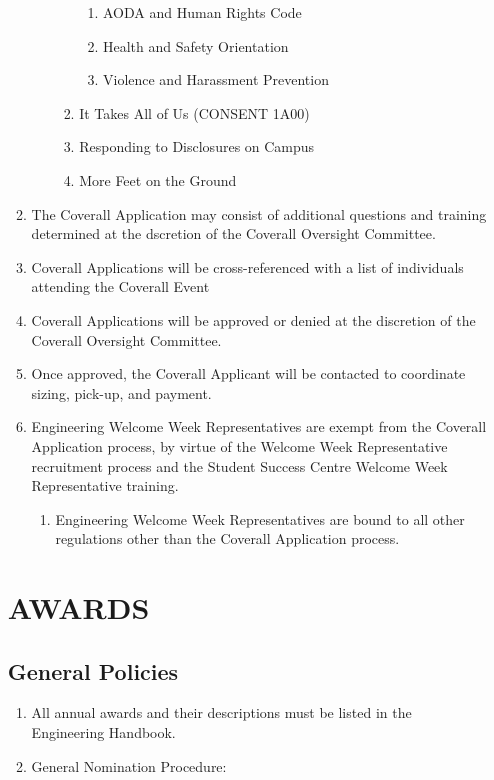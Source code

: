 \begin{enumerate}
\begin{enumerate}
\begin{enumerate}
\begin{enumerate}
      \begin{enumerate}
       \item
        AODA and Human Rights Code
       \item
        Health and Safety Orientation
       \item
        Violence and Harassment Prevention
      \end{enumerate}
     \item
      It Takes All of Us (CONSENT 1A00)
     \item
      Responding to Disclosures on Campus
     \item
      More Feet on the Ground
    \end{enumerate}
  \end{enumerate}
 \item
  The Coverall Application may consist of additional questions and
  training determined at the dscretion of the Coverall Oversight
  Committee.
 \item
  Coverall Applications will be cross-referenced with a list of
  individuals attending the Coverall Event
 \item
  Coverall Applications will be approved or denied at the discretion of
  the Coverall Oversight Committee.
 \item
  Once approved, the Coverall Applicant will be contacted to coordinate
  sizing, pick-up, and payment.
 \item
  Engineering Welcome Week Representatives are exempt from the Coverall
  Application process, by virtue of the Welcome Week Representative
  recruitment process and the Student Success Centre Welcome Week
  Representative training.
  \begin{enumerate}
    \item
     Engineering Welcome Week Representatives are bound to all other
     regulations other than the Coverall Application process.
  \end{enumerate}
\end{enumerate}

\hypertarget{awards}{%
 \section{AWARDS}
 \label{awards}}

\hypertarget{general-policies}{%
 \subsection{General Policies}
 \label{general-policies}}
\begin{enumerate}
 \item
  All annual awards and their descriptions must be listed in the
  Engineering Handbook.
 \item
  General Nomination Procedure:


\end{enumerate}
\end{enumerate}
